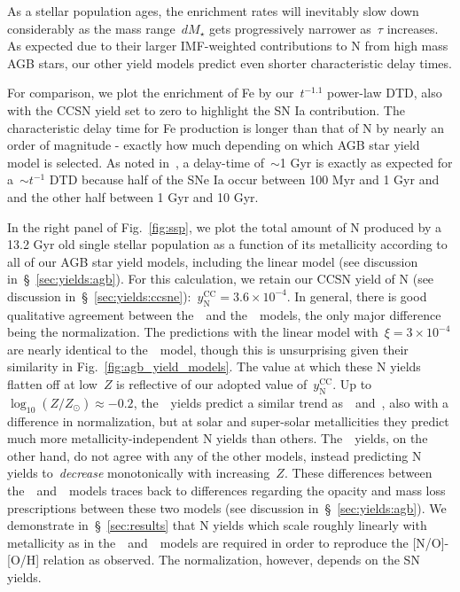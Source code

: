 \documentclass[ms.tex]{subfiles}
\begin{document}
As a stellar population ages, the enrichment rates will inevitably slow down
considerably as the mass range~$dM_\star$ gets progressively narrower as~$\tau$
increases.
As expected due to their larger IMF-weighted contributions to N from high mass
AGB stars, our other yield models predict even shorter characteristic delay
times.
\par
For comparison, we plot the enrichment of Fe by our~$t^{-1.1}$ power-law DTD,
also with the CCSN yield set to zero to highlight the SN Ia contribution.
The characteristic delay time for Fe production is longer than that of N by
nearly an order of magnitude - exactly how much depending on which AGB star
yield model is selected.
As noted in~\citet{Johnson2021}, a delay-time of~$\sim$1 Gyr is exactly as
expected for a~$\sim t^{-1}$ DTD because half of the SNe Ia occur between
100 Myr and 1 Gyr and and the other half between 1 Gyr and 10 Gyr.
\par
In the right panel of Fig.~\ref{fig:ssp}, we plot the total amount of N
produced by a 13.2 Gyr old single stellar population as a function of its
metallicity according to all of our AGB star yield models, including the linear
model (see discussion in~\S~\ref{sec:yields:agb}).
For this calculation, we retain our CCSN yield of N (see discussion
in~\S~\ref{sec:yields:ccsne}):~$y_\text{N}^\text{CC} = 3.6\times10^{-4}$.
In general, there is good qualitative agreement between the~\cristallo~and
the~\ventura~models, the only major difference being the normalization.
The predictions with the linear model with~$\xi = 3\times10^{-4}$ are nearly
identical to the~\cristallo~model, though this is unsurprising given their
similarity in Fig.~\ref{fig:agb_yield_models}.
The value at which these N yields flatten off at low~$Z$ is reflective of our
adopted value of~$y_\text{N}^\text{CC}$.
Up to~$\log_{10}(Z / Z_\odot) \approx -0.2$, the~\karakas~yields predict a
similar trend as~\cristallo~and~\ventura, also with a difference in
normalization, but at solar and super-solar metallicities they predict much
more metallicity-independent N yields than others.
The~\karakasten~yields, on the other hand, do not agree with any of the other
models, instead predicting N yields to~\textit{decrease} monotonically with
increasing~$Z$.
These differences between the~\karakasten~and~\karakas~models traces back to
differences regarding the opacity and mass loss prescriptions between these
two models (see discussion in~\S~\ref{sec:yields:agb}).
We demonstrate in~\S~\ref{sec:results} that N yields which scale roughly
linearly with metallicity as in the~\cristallo~and~\ventura~models are required
in order to reproduce the [N/O]-[O/H] relation as observed.
The normalization, however, depends on the SN yields.
\end{document}
